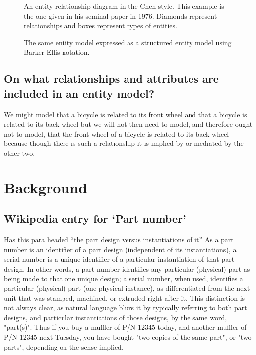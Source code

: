 \begin{figure}
\begin{center}

\end{center}
\caption{
An entity relationship diagram in the Chen style. This example is the one given in his seminal paper in 1976.
Diamonds represent relationships and boxes represent types of entities.
}
\end{figure}

\begin{figure}
\begin{center}

\end{center}
\caption{
The same entity model expressed as a structured entity model using Barker-Ellis notation.
}
\end{figure}

\subsection{On what relationships and attributes are included in an entity model?}
\mynote We might model that a bicycle is related to its front wheel and that a bicycle is related to its back wheel but we will not then need to model,  and therefore ought not to model, that the front wheel of a bicycle is related to its back wheel because though there is such a relationship it is implied by or mediated by the other two.  

\section{Background}
\subsection{Wikipedia entry for `Part number'}
Has this para headed ``the part design versus instantiations of it''
As a part number is an identifier of a part design (independent of its instantiations), a serial number is a unique identifier of a particular instantiation of that part design. In other words, a part number identifies any particular (physical) part as being made to that one unique design; a serial number, when used, identifies a particular (physical) part (one physical instance), as differentiated from the next unit that was stamped, machined, or extruded right after it. This distinction is not always clear, as natural language blurs it by typically referring to both part designs, and particular instantiations of those designs, by the same word, "part(s)". Thus if you buy a muffler of P/N 12345 today, and another muffler of P/N 12345 next Tuesday, you have bought "two copies of the same part", or "two parts", depending on the sense implied.




